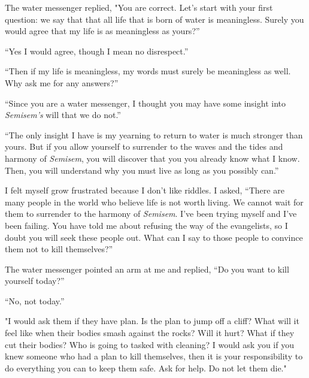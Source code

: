\documentclass[12pt, letterpaper]{report}
\begin{document}
\vspace{1\baselineskip}
The water messenger replied, "You are correct. Let's start with your first question: we say that that all life that is born of water is meaningless. Surely you would agree that my life is as meaningless as yours?''

\vspace{1\baselineskip}
``Yes I would agree, though I mean no disrespect.''

\vspace{1\baselineskip}
``Then if my life is meaningless, my words must surely be meaningless as well. Why ask me for any answers?''

\vspace{1\baselineskip}
``Since you are a water messenger, I thought you may have some insight into \textit{Semisem's} will that we do not.''

\vspace{1\baselineskip}
``The only insight I have is my yearning to return to water is much stronger than yours. But if you allow yourself to surrender to the waves and the tides and harmony of \textit{Semisem}, you will discover that you you already know what I know. Then, you will understand why you must live as long as you possibly can.''

\vspace{1\baselineskip}
I felt myself grow frustrated because I don't like riddles. I asked, ``There are many people in the world who believe life is not worth living. We cannot wait for them to surrender to the harmony of \textit{Semisem}. I've been trying myself and I've been failing. You have told me about refusing the way of the evangelists, so I doubt you will seek these people out. What can I say to those people to convince them not to kill themselves?''

\vspace{1\baselineskip}
The water messenger pointed an arm at me and replied, ``Do you want to kill yourself today?''

\vspace{1\baselineskip}
``No, not today.''

\vspace{1\baselineskip}
"I would ask them if they have plan. Is the plan to jump off a cliff? What will it feel like when their bodies smash against the rocks? Will it hurt? What if they cut their bodies? Who is going to tasked with cleaning? I would ask you if you knew someone who had a plan to kill themselves, then it is your responsibility to do everything you can to keep them safe. Ask for help. Do not let them die."
\end{document}
